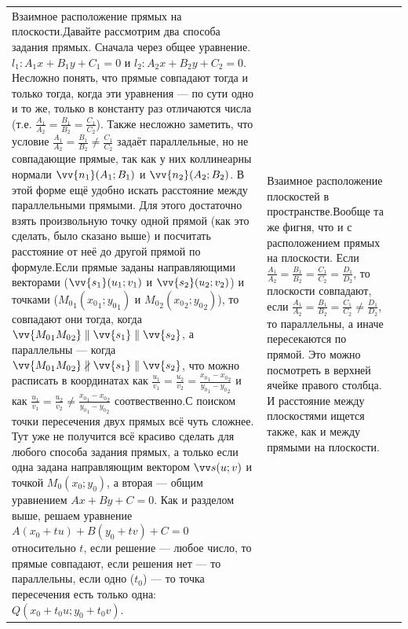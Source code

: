 \documentclass{article}
\let\vec\vv
\begin{document}
\begin{itemize}
\begin{Comment}
\begin{tabular}{|m{}|m{}|m{}|}
                Взаимное расположение прямых на плоскости.\newline Давайте рассмотрим два способа задания прямых. Сначала через общее уравнение. $l_1\colon A_1x+B_1y+C_1=0$ и $l_2\colon A_2x+B_2y+C_2=0$. Несложно понять, что прямые совпадают тогда и только тогда, когда эти уравнения --- по сути одно и то же, только в константу раз отличаются числа (т.е. $\frac{A_1}{A_2}=\frac{B_1}{B_2}=\frac{C_1}{C_2}$). Также несложно заметить, что условие $\frac{A_1}{A_2}=\frac{B_1}{B_2}\neq\frac{C_1}{C_2}$ задаёт параллельные, но не совпадающие прямые, так как у них коллинеарны нормали $\vec{n_1}(A_1;B_1)$ и $\vec{n_2}(A_2;B_2)$. В этой форме ещё удобно искать расстояние между параллельными прямыми. Для этого достаточно взять произвольную точку одной прямой (как это сделать, было сказано выше) и посчитать расстояние от неё до другой прямой по формуле.\newline Если прямые заданы направляющими векторами ($\vec{s_1}(u_1;v_1)$ и $\vec{s_2}(u_2;v_2)$) и точками (${M_0}_1({x_0}_1;{y_0}_1)$ и ${M_0}_2({x_0}_2;{y_0}_2)$), то совпадают они тогда, когда $\vec{{M_0}_1{M_0}_2}\parallel\vec{s_1}\parallel\vec{s_2}$, а параллельны --- когда $\vec{{M_0}_1{M_0}_2}\nparallel\vec{s_1}\parallel\vec{s_2}$, что можно расписать в координатах как $\frac{u_1}{v_1}=\frac{u_2}{v_2}=\frac{{x_0}_1-{x_0}_2}{{y_0}_1-{y_0}_2}$ и как $\frac{u_1}{v_1}=\frac{u_2}{v_2}\neq\frac{{x_0}_1-{x_0}_2}{{y_0}_1-{y_0}_2}$ соотвественно.\newline С поиском точки пересечения двух прямых всё чуть сложнее. Тут уже не получится всё красиво сделать для любого способа задания прямых, а только если одна задана направляющим вектором $\vec s(u;v)$ и точкой $M_0(x_0;y_0)$, а вторая --- общим уравнением $Ax+By+C=0$. Как и разделом выше, решаем уравнение $A(x_0+tu)+B(y_0+tv)+C=0$ относительно $t$, если решение --- любое число, то прямые совпадают, если решения нет --- то параллельны, если одно ($t_0$) --- то точка пересечения есть только одна: $Q(x_0+t_0u;y_0+t_0v)$.&
                Взаимное расположение плоскостей в пространстве.\newline Вообще та же фигня, что и с расположением прямых на плоскости. Если $\frac{A_1}{A_2}=\frac{B_1}{B_2}=\frac{C_1}{C_2}=\frac{D_1}{D_2}$, то плоскости совпадают, если $\frac{A_1}{A_2}=\frac{B_1}{B_2}=\frac{C_1}{C_2}\neq\frac{D_1}{D_2}$, то параллельны, а иначе пересекаются по прямой. Это можно посмотреть в верхней ячейке правого столбца. И расстояние между плоскостями ищется также, как и между прямыми на плоскости.&

\end{tabular}
\end{Comment}
\end{itemize}
\end{document}
